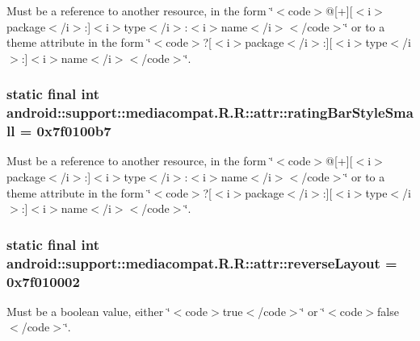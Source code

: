 Must be a reference to another resource, in the form \char`\"{}$<$code$>$@\mbox{[}+\mbox{]}\mbox{[}$<$i$>$package$<$/i$>$:\mbox{]}$<$i$>$type$<$/i$>$:$<$i$>$name$<$/i$>$$<$/code$>$\char`\"{} or to a theme attribute in the form \char`\"{}$<$code$>$?\mbox{[}$<$i$>$package$<$/i$>$:\mbox{]}\mbox{[}$<$i$>$type$<$/i$>$:\mbox{]}$<$i$>$name$<$/i$>$$<$/code$>$\char`\"{}. \hypertarget{classandroid_1_1support_1_1mediacompat_1_1_r_1_1attr_bcca7a8d4cab287a232e561afc7fcfa3}{
\subsubsection[{ratingBarStyleSmall}]{\setlength{\rightskip}{0pt plus 5cm}static final int android::support::mediacompat.R.R::attr::ratingBarStyleSmall = 0x7f0100b7}}
\label{classandroid_1_1support_1_1mediacompat_1_1_r_1_1attr_bcca7a8d4cab287a232e561afc7fcfa3}


Must be a reference to another resource, in the form \char`\"{}$<$code$>$@\mbox{[}+\mbox{]}\mbox{[}$<$i$>$package$<$/i$>$:\mbox{]}$<$i$>$type$<$/i$>$:$<$i$>$name$<$/i$>$$<$/code$>$\char`\"{} or to a theme attribute in the form \char`\"{}$<$code$>$?\mbox{[}$<$i$>$package$<$/i$>$:\mbox{]}\mbox{[}$<$i$>$type$<$/i$>$:\mbox{]}$<$i$>$name$<$/i$>$$<$/code$>$\char`\"{}. \hypertarget{classandroid_1_1support_1_1mediacompat_1_1_r_1_1attr_388540c29cfe031aa89a2c19d6b08c32}{
\subsubsection[{reverseLayout}]{\setlength{\rightskip}{0pt plus 5cm}static final int android::support::mediacompat.R.R::attr::reverseLayout = 0x7f010002}}
\label{classandroid_1_1support_1_1mediacompat_1_1_r_1_1attr_388540c29cfe031aa89a2c19d6b08c32}


Must be a boolean value, either \char`\"{}$<$code$>$true$<$/code$>$\char`\"{} or \char`\"{}$<$code$>$false$<$/code$>$\char`\"{}. 

